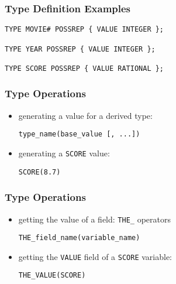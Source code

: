 \documentclass[dvipsnames]{beamer}
\theoremstyle{plain}
\begin{document}
\begin{frame}[fragile]
  \frametitle{Type Definition Examples}

  \begin{example}
    \begin{lstlisting}
TYPE MOVIE# POSSREP { VALUE INTEGER };

TYPE YEAR POSSREP { VALUE INTEGER };

TYPE SCORE POSSREP { VALUE RATIONAL };
    \end{lstlisting}
  \end{example}
\end{frame}

\begin{frame}[fragile]
  \frametitle{Type Operations}

  \begin{itemize}
    \item generating a value for a derived type:
    \begin{lstlisting}
type_name(base_value [, ...])
    \end{lstlisting}
  \end{itemize}

  \begin{example}
    \begin{itemize}
      \item generating a \texttt{SCORE} value:
      \begin{lstlisting}
SCORE(8.7)
      \end{lstlisting}
    \end{itemize}
  \end{example}
\end{frame}

\begin{frame}[fragile]
  \frametitle{Type Operations}

  \begin{itemize}
    \item getting the value of a field: \lstinline!THE_! operators
    \begin{lstlisting}
THE_field_name(variable_name)
    \end{lstlisting}
  \end{itemize}

  \begin{example}
    \begin{itemize}
      \item getting the \texttt{VALUE} field of a \texttt{SCORE} variable:
      \begin{lstlisting}
THE_VALUE(SCORE)
      \end{lstlisting}
    \end{itemize}
  \end{example}
\end{frame}
\end{document}
